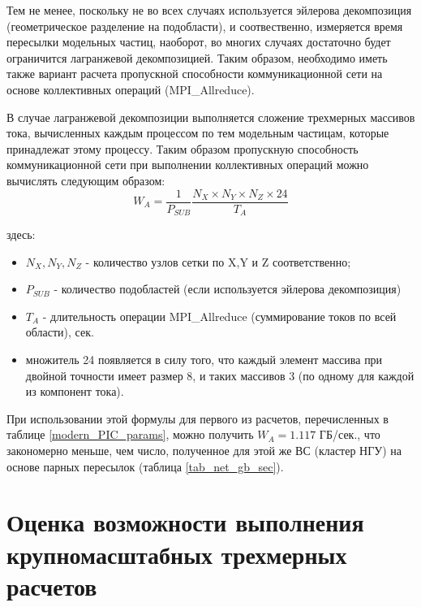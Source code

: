 \clearpage

Тем не менее, поскольку не во всех случаях используется эйлерова декомпозиция (геометрическое разделение на подобласти), и соотвественно, измеряется время пересылки модельных частиц, наоборот, во многих случаях достаточно будет ограничится лагранжевой декомпозицией. Таким образом, необходимо иметь также вариант расчета пропускной способности коммуникационной сети на основе коллективных операций (MPI\_Allreduce).

В случае лагранжевой декомпозиции выполняется сложение трехмерных массивов тока, вычисленных каждым процессом по тем модельным частицам, которые принадлежат этому процессу. Таким образом пропускную способность коммуникационной сети при выполнении коллективных операций можно вычислять следующим образом:
\begin{equation}
W_A = \frac{1}{P_{SUB}}\frac{N_X\times N_Y \times N_Z \times 24}{T_A}
\label{Net_performance_collective}
\end{equation}

здесь:
\begin{itemize}
	\item $N_X, N_Y, N_Z$ - количество узлов сетки по X,Y и Z соответственно;
	\item $P_{SUB}$ - количество подобластей (если используется эйлерова декомпозиция)
	\item $T_{A}$ - длительность операции MPI\_Allreduce (суммирование токов по всей области), сек.
	\item множитель 24 появляется в силу того, что каждый элемент массива при двойной точности имеет размер 8, и таких массивов 3 (по одному для каждой из компонент тока).
\end{itemize}	

При использовании этой формулы для первого из расчетов, перечисленных в таблице \ref{modern_PIC_params}, можно получить 
$W_A = 1.117$ ГБ/сек., что закономерно меньше, чем число, полученное для этой же ВС (кластер НГУ) на основе парных пересылок
(таблица \ref{tab_net_gb_sec}).





%		
%		

\section{Оценка возможности выполнения крупномасштабных трехмерных расчетов}
\label{Big3D}

